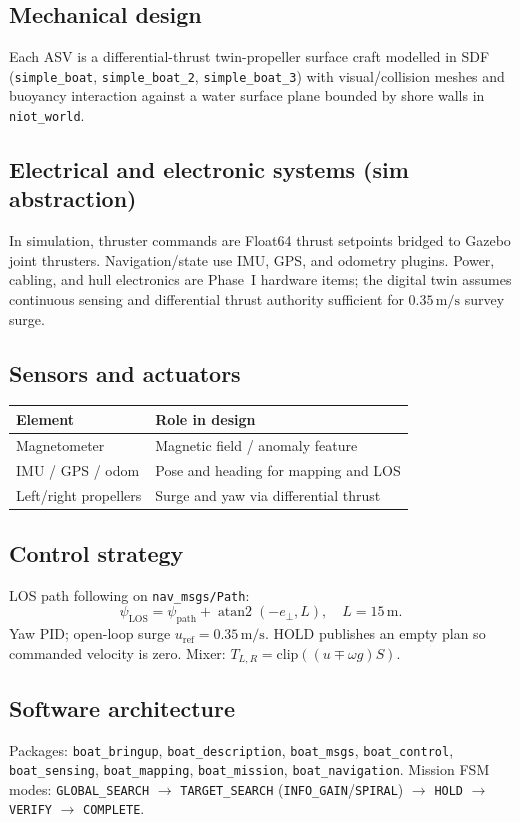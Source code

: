 \documentclass[11pt,a4paper]{article}
\begin{document}
\subsection{Mechanical design}
Each ASV is a differential-thrust twin-propeller surface craft modelled in SDF
(\texttt{simple\_boat}, \texttt{simple\_boat\_2}, \texttt{simple\_boat\_3}) with
visual/collision meshes and buoyancy interaction against a water surface plane
bounded by shore walls in \texttt{niot\_world}.

\subsection{Electrical and electronic systems (sim abstraction)}
In simulation, thruster commands are Float64 thrust setpoints bridged to Gazebo
joint thrusters. Navigation/state use IMU, GPS, and odometry plugins. Power,
cabling, and hull electronics are Phase~I hardware items; the digital twin
assumes continuous sensing and differential thrust authority sufficient for
$0.35\,\mathrm{m/s}$ survey surge.

\subsection{Sensors and actuators}
\begin{center}
\begin{tabular}{@{}ll@{}}
\toprule
\textbf{Element} & \textbf{Role in design} \\
\midrule
Magnetometer & Magnetic field / anomaly feature \\
IMU / GPS / odom & Pose and heading for mapping and LOS \\
Left/right propellers & Surge and yaw via differential thrust \\
\bottomrule
\end{tabular}
\end{center}

\subsection{Control strategy}
LOS path following on \texttt{nav\_msgs/Path}:
\[
\psi_{\mathrm{LOS}}=\psi_{\mathrm{path}}+\operatorname{atan2}(-e_{\perp},L),\quad L=15\,\mathrm{m}.
\]
Yaw PID; open-loop surge $u_{\mathrm{ref}}=0.35\,\mathrm{m/s}$. HOLD publishes an
empty plan so commanded velocity is zero. Mixer:
$T_{L,R}=\mathrm{clip}((u\mp\omega g)S)$.

\subsection{Software architecture}
Packages: \texttt{boat\_bringup}, \texttt{boat\_description}, \texttt{boat\_msgs},
\texttt{boat\_control}, \texttt{boat\_sensing}, \texttt{boat\_mapping},
\texttt{boat\_mission}, \texttt{boat\_navigation}. Mission FSM modes:
\texttt{GLOBAL\_SEARCH} $\to$ \texttt{TARGET\_SEARCH}
(\texttt{INFO\_GAIN}/\texttt{SPIRAL}) $\to$ \texttt{HOLD} $\to$ \texttt{VERIFY}
$\to$ \texttt{COMPLETE}.
\end{document}
